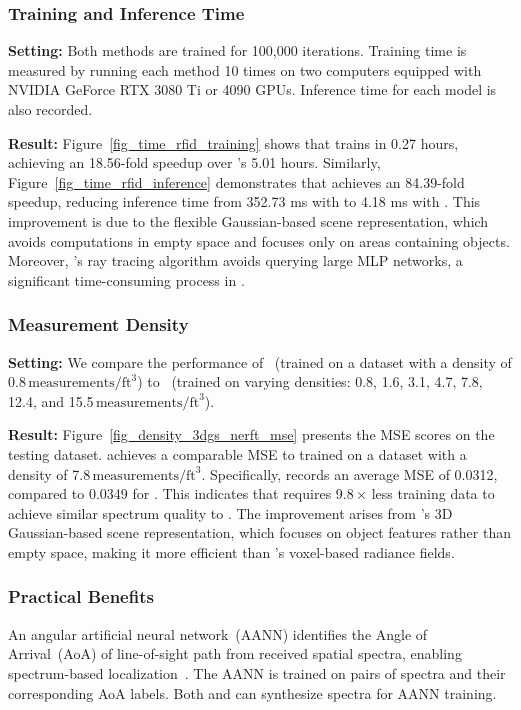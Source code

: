 \subsubsection{Training and Inference Time}  
\textbf{Setting:}
Both methods are trained for 100,000 iterations.  
Training time is measured by running each method 10 times on two computers equipped with NVIDIA GeForce RTX 3080 Ti or 4090 GPUs.  
Inference time for each model is also recorded.



\textbf{Result:}
Figure~\ref{fig_time_rfid_training} shows that \ourSystem trains in 0.27 hours, achieving an 18.56-fold speedup over \nerft's 5.01 hours.
Similarly, Figure~\ref{fig_time_rfid_inference} demonstrates that \ourSystem achieves an 84.39-fold speedup, reducing inference time from 352.73 ms with \nerft to 4.18 ms with \ourSystem.
This improvement is due to the flexible Gaussian-based scene representation, which avoids computations in empty space and focuses only on areas containing objects. 
Moreover, \ourSystem's ray tracing algorithm avoids querying large MLP networks, a significant time-consuming process in \nerft.


\subsubsection{Measurement Density}\label{sec_rfid_density}  
\textbf{Setting:} 
We compare the performance of \ourSystem~(trained on a dataset with a density of 0.8\,\(\text{measurements}/\text{ft}^3\)) to \nerft~(trained on varying densities: 0.8, 1.6, 3.1, 4.7, 7.8, 12.4, and 15.5\,\(\text{measurements}/\text{ft}^3\)).  


\textbf{Result:}  
Figure~\ref{fig_density_3dgs_nerft_mse} presents the MSE scores on the testing dataset.  
\ourSystem achieves a comparable MSE to \nerft trained on a dataset with a density of 7.8\,\(\text{measurements}/\text{ft}^3\).  
Specifically, \ourSystem records an average MSE of 0.0312, compared to 0.0349 for \nerft.  
This indicates that \ourSystem requires 9.8\,$\times$ less training data to achieve similar spectrum quality to \nerft.  
The improvement arises from \ourSystem's 3D Gaussian-based scene representation, which focuses on object features rather than empty space, making it more efficient than \nerft's voxel-based radiance fields.  



\subsubsection{Practical Benefits}\label{sec_rfid_loc}
An angular artificial neural network~(AANN) identifies the Angle of Arrival~(AoA) of line-of-sight path from received spatial spectra, enabling spectrum-based localization~\cite{an2020general}.  
The AANN is trained on pairs of spectra and their corresponding AoA labels.
Both \ourSystem and \nerft can synthesize spectra for AANN training.  


